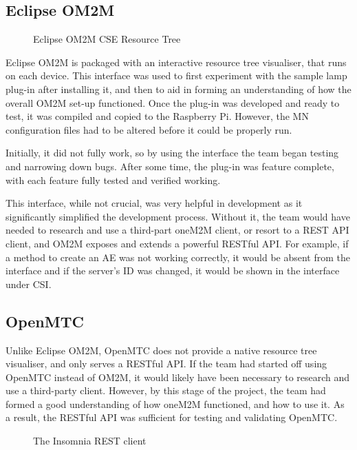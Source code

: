 \subsection{Eclipse OM2M}

\begin{figure}[H]
  \centering
  \caption{Eclipse OM2M CSE Resource Tree}
  \label{fig:viewing-the-eclipse-resource-tree}
\end{figure}

Eclipse OM2M is packaged with an interactive resource tree visualiser, that runs on each device. This interface was used to first experiment with the sample lamp plug-in after installing it, and then to aid in forming an understanding of how the overall OM2M set-up functioned. Once the plug-in was developed and ready to test, it was compiled and copied to the Raspberry Pi. However, the MN configuration files had to be altered before it could be properly run.

Initially, it did not fully work, so by using the interface the team began testing and narrowing down bugs. After some time, the plug-in was feature complete, with each feature fully tested and verified working.

This interface, while not crucial, was very helpful in development as it significantly simplified the development process. Without it, the team would have needed to research and use a third-part oneM2M client, or resort to a REST API client, and OM2M exposes and extends a powerful RESTful API. For example, if a method to create an AE was not working correctly, it would be absent from the interface and if the server's ID was changed, it would be shown in the interface under CSI.

\subsection{OpenMTC}

Unlike Eclipse OM2M, OpenMTC does not provide a native resource tree visualiser, and only serves a RESTful API. If the team had started off using OpenMTC instead of OM2M, it would likely have been necessary to research and use a third-party client. However, by this stage of the project, the team had formed a good understanding of how oneM2M functioned, and how to use it. As a result, the RESTful API was sufficient for testing and validating OpenMTC.

\begin{figure}[H]
  \centering
  \caption{The Insomnia REST client}
  \label{fig:insomnia-rest-client}
\end{figure}

